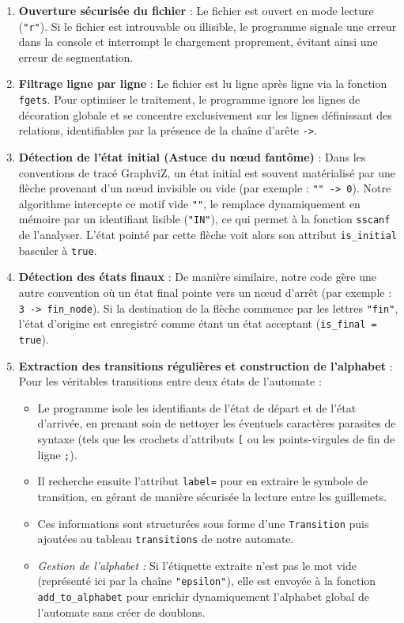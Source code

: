 \documentclass[12pt,a4paper]{article}
\begin{document}
\begin{enumerate}
    \item \textbf{Ouverture sécurisée du fichier} : Le fichier est ouvert en mode lecture (\texttt{"r"}). Si le fichier est introuvable ou illisible, le programme signale une erreur dans la console et interrompt le chargement proprement, évitant ainsi une erreur de segmentation.

    \item \textbf{Filtrage ligne par ligne} : Le fichier est lu ligne après ligne via la fonction \texttt{fgets}. Pour optimiser le traitement, le programme ignore les lignes de décoration globale et se concentre exclusivement sur les lignes définissant des relations, identifiables par la présence de la chaîne d'arête \texttt{->}.

    \item \textbf{Détection de l'état initial (Astuce du nœud fantôme)} : Dans les conventions de tracé GraphviZ, un état initial est souvent matérialisé par une flèche provenant d'un nœud invisible ou vide (par exemple : \texttt{"" -> 0}). Notre algorithme intercepte ce motif vide \texttt{""}, le remplace dynamiquement en mémoire par un identifiant lisible (\texttt{"IN"}), ce qui permet à la fonction \texttt{sscanf} de l'analyser. L'état pointé par cette flèche voit alors son attribut \texttt{is\_initial} basculer à \texttt{true}.

    \item \textbf{Détection des états finaux} : De manière similaire, notre code gère une autre convention où un état final pointe vers un nœud d'arrêt (par exemple : \texttt{3 -> fin\_node}). Si la destination de la flèche commence par les lettres \texttt{"fin"}, l'état d'origine est enregistré comme étant un état acceptant (\texttt{is\_final = true}).

    \item \textbf{Extraction des transitions régulières et construction de l'alphabet} : Pour les véritables transitions entre deux états de l'automate :
    \begin{itemize}
        \item Le programme isole les identifiants de l'état de départ et de l'état d'arrivée, en prenant soin de nettoyer les éventuels caractères parasites de syntaxe (tels que les crochets d'attributs \texttt{[} ou les points-virgules de fin de ligne \texttt{;}).
        \item Il recherche ensuite l'attribut \texttt{label=} pour en extraire le symbole de transition, en gérant de manière sécurisée la lecture entre les guillemets.
        \item Ces informations sont structurées sous forme d'une \texttt{Transition} puis ajoutées au tableau \texttt{transitions} de notre automate.
        \item \textit{Gestion de l'alphabet :} Si l'étiquette extraite n'est pas le mot vide (représenté ici par la chaîne \texttt{"epsilon"}), elle est envoyée à la fonction \texttt{add\_to\_alphabet} pour enrichir dynamiquement l'alphabet global de l'automate sans créer de doublons.
    \end{itemize}


\end{enumerate}
\end{document}
